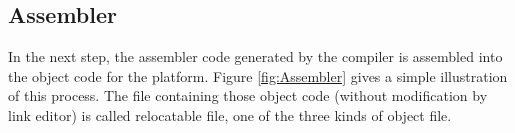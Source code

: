              
             

             
             
             
    \subsection{Assembler} \label{subsection:Assembler}
        In the next step, the assembler code generated by the compiler is assembled into the object code for the platform. Figure \ref{fig:Assembler} gives a simple illustration of this process. The file containing those object code (without modification by link editor) is called relocatable file\cite{TIS-95}, one of the three kinds of object file. 
        
